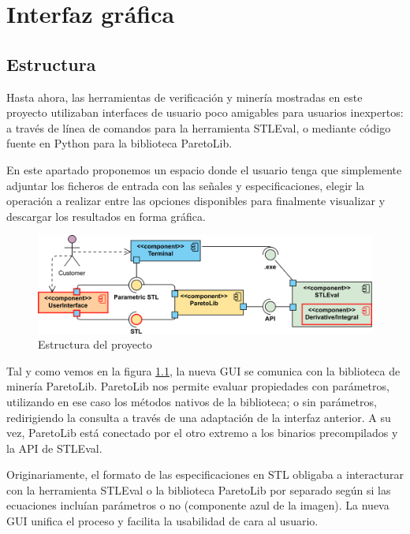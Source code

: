 \chapter{Interfaz gráfica}
\label{cha:gui}

\section{Estructura} 
Hasta ahora, las herramientas de verificación y minería mostradas en este proyecto utilizaban interfaces de usuario poco amigables para usuarios inexpertos: a través de línea de comandos para la herramienta STLEval, o mediante código fuente en Python para la biblioteca ParetoLib.

En este apartado proponemos un espacio donde el usuario tenga que simplemente adjuntar los ficheros de entrada con las señales y especificaciones, elegir la operación a realizar entre las opciones disponibles para finalmente visualizar y descargar los resultados en forma gráfica.
 
\begin{figure}[htb]
\centering
  \includegraphics[width=.95\linewidth]{images/uml_diagram} 
\caption{Estructura del proyecto}
\label{fig:est}
\end{figure}

Tal y como vemos en la figura \ref{fig:est}, la nueva GUI se comunica con la biblioteca de minería ParetoLib. ParetoLib nos permite evaluar propiedades con parámetros, utilizando en ese caso los métodos nativos de la biblioteca; o sin parámetros, redirigiendo la consulta a través de una adaptación de la interfaz anterior. A su vez, ParetoLib está conectado por el otro extremo a los binarios precompilados y la API de STLEval.

Originariamente, el formato de las especificaciones en STL obligaba a interacturar con la herramienta STLEval o la biblioteca ParetoLib por separado según si las ecuaciones incluían parámetros o no (componente azul de la imagen).
La nueva GUI unifica el proceso y facilita la usabilidad de cara al usuario.



